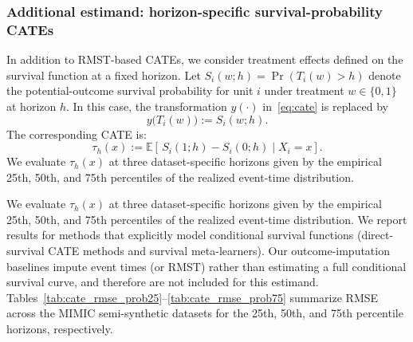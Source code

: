 \documentclass{article} %
\begin{document}
\subsubsection{Additional estimand: horizon-specific survival-probability CATEs}
\label{app:surv_prob}

In addition to RMST-based CATEs, we consider treatment effects defined on the survival function at a fixed horizon. Let $S_i(w;h)=\Pr(T_i(w)>h)$ denote the potential-outcome survival probability for unit $i$ under treatment $w\in\{0,1\}$ at horizon $h$. In this case, the transformation $y(\cdot)$ in~\eqref{eq:cate} is replaced by
\[
y\big(T_i(w)\big) := S_i(w; h).
\]
The corresponding CATE is:
\begin{equation}
    \tau_h(x) := \mathbb{E}\!\left[\, S_i(1; h) - S_i(0; h) \mid X_i=x \right].
\end{equation}
We evaluate $\tau_h(x)$ at three dataset-specific horizons given by the empirical 25th, 50th, and 75th percentiles of the realized event-time distribution.

We evaluate $\tau_h(x)$ at three dataset-specific horizons given by the empirical 25th, 50th, and 75th percentiles of the realized event-time distribution. We report results for methods that explicitly model conditional survival functions (direct-survival CATE methods and survival meta-learners). Our outcome-imputation baselines impute event times (or RMST) rather than estimating a full conditional survival curve, and therefore are not included for this estimand.
Tables~\ref{tab:cate_rmse_prob25}--\ref{tab:cate_rmse_prob75} summarize RMSE across the MIMIC semi-synthetic datasets for the 25th, 50th, and 75th percentile horizons, respectively. 
\end{document}
